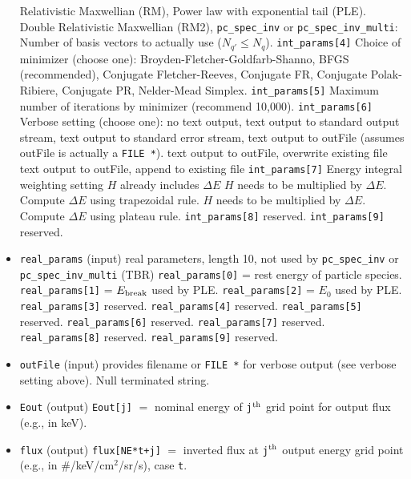 \documentclass{article}    %
\begin{document}
\begin{itemize}
\subsubitem[4] Relativistic Maxwellian (RM),
\subsubitem[8] Power law with exponential tail (PLE).
\subsubitem[16] Double Relativistic Maxwellian (RM2),
\subsubitem \verb|pc_spec_inv| or \verb|pc_spec_inv_multi|: Number of basis vectors to actually use ($N_{q'} \le N_q$).
\subitem \verb|int_params[4]| Choice of minimizer (choose one):
\subsubitem[0] Broyden-Fletcher-Goldfarb-Shanno, BFGS (recommended),
\subsubitem[1] Conjugate Fletcher-Reeves, Conjugate FR,
\subsubitem[2] Conjugate Polak-Ribiere, Conjugate PR,
\subsubitem[3] Nelder-Mead Simplex.
\subitem \verb|int_params[5]| Maximum number of iterations by minimizer (recommend 10,000).
\subitem \verb|int_params[6]| Verbose setting (choose one):
\subsubitem[0] no text output,
\subsubitem[1] text output to standard output stream,
\subsubitem[2] text output to standard error stream,
\subsubitem[3] text output to outFile (assumes outFile is actually a \verb|FILE *|).
\subsubitem[4] text output to outFile, overwrite existing file
\subsubitem[5] text output to outFile, append to existing file
\subitem \verb|int_params[7]| Energy integral weighting setting
\subsubitem[0] $H$ already includes $\Delta E$
\subsubitem[1] $H$ needs to be multiplied by $\Delta E$. Compute $\Delta E$ using trapezoidal rule.
\subsubitem[2] $H$ needs to be multiplied by $\Delta E$. Compute $\Delta E$ using plateau rule.
\subitem \verb|int_params[8]| reserved.
\subitem \verb|int_params[9]| reserved.
\item \verb|real_params| (input) real parameters, length 10, not used by \verb|pc_spec_inv| or \verb|pc_spec_inv_multi| (TBR)
\subitem \verb|real_params[0]| = rest energy of particle species.
\subitem \verb|real_params[1]| = $E_{\rm break}$ used by PLE.
\subitem \verb|real_params[2]| = $E_0$ used by PLE.
\subitem \verb|real_params[3]| reserved.
\subitem \verb|real_params[4]| reserved.
\subitem \verb|real_params[5]| reserved.
\subitem \verb|real_params[6]| reserved.
\subitem \verb|real_params[7]| reserved.
\subitem \verb|real_params[8]| reserved.
\subitem \verb|real_params[9]| reserved.
\item \verb|outFile| (input) provides filename or \verb|FILE *| for verbose output (see verbose setting above). Null terminated string.
\item \verb|Eout| (output) \verb|Eout[j]| $=$ nominal energy of \verb|j|$^{\rm th}$ grid point for output flux (e.g., in keV).
\item \verb|flux| (output) \verb|flux[NE*t+j]| $=$ inverted flux at \verb|j|$^{\rm th}$ output energy grid point (e.g., in \#/keV/cm$^2$/sr/s), case \verb|t|.

\end{itemize}
\end{document}
